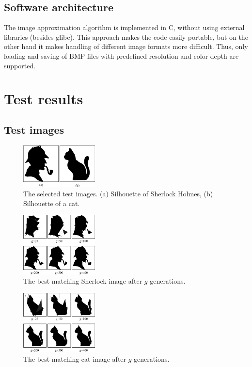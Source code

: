 \documentclass[conference]{IEEEtran}
\begin{document}
\subsection{Software architecture}

The image approximation algorithm is implemented in C,
without using external libraries (besides glibc). This
approach makes the code easily portable, but on the other
hand it makes handling of different image formats more
difficult. Thus, only loading and saving of BMP files
with predefined resolution and color depth are supported.

\section{Test results}

\subsection{Test images}

\begin{figure}[htbp]
	\centering
	\includegraphics[width=0.35\textwidth]{fig/originals.png}
	\caption{The selected test images. (a) Silhouette of Sherlock Holmes, (b) Silhouette of a cat.}
	\label{fig-orig}
\end{figure}

\begin{figure}[htbp]
	\centering
	\includegraphics[width=0.35\textwidth]{fig/sherlock6.png}
	\caption{The best matching Sherlock image after $g$ generations.}
	\label{sherlock-6}
\end{figure}

\begin{figure}[htbp]
	\centering
	\includegraphics[width=0.35\textwidth]{fig/cat6.png}
	\caption{The best matching cat image after $g$ generations.}
	\label{cat-6}
\end{figure}
\end{document}
